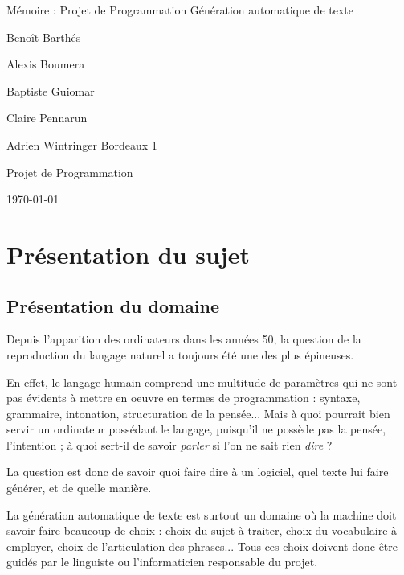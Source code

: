 \documentclass[12pt]{report}
\begin{document}
\begin{titlepage}
\begin{center}

\hfill

\bigskip
\huge{Mémoire  : Projet de Programmation} 
\vfill
\bigskip 
\Huge 
\bigskip Génération automatique de texte \par 
\vfill
\Large Benoît Barthés \par 
		Alexis Boumera \par 
		Baptiste Guiomar \par 
		Claire Pennarun \par 
		Adrien Wintringer
\vfill
\Large Bordeaux 1 \par \Large Projet de Programmation		
		\bigskip 
\bigskip

\Large
\today
\end{center}
\end{titlepage}

\tableofcontents
\newpage

\chapter{Présentation du sujet}

\section{Présentation du domaine}

	Depuis l'apparition des ordinateurs dans les années 50, la question de la reproduction du langage naturel a toujours été une des plus épineuses. \par 
	En effet, le langage humain comprend une multitude de paramètres qui ne sont pas évidents à mettre en oeuvre en termes de programmation : syntaxe, grammaire, intonation, structuration de la pensée... Mais à quoi pourrait bien servir un ordinateur possédant le langage, puisqu'il ne possède pas la pensée, l'intention ; à quoi sert-il de savoir \emph{parler} si l'on ne sait rien \emph{dire} ?

	La question est donc de savoir quoi faire dire à un logiciel, quel texte lui faire générer, et de quelle manière.
	\bigskip 
	
	La génération automatique de texte est surtout un domaine où la machine doit savoir faire beaucoup de choix : choix du sujet à traiter, choix du vocabulaire à employer, choix de l'articulation des phrases... Tous ces choix doivent donc être guidés par le linguiste ou l'informaticien responsable du projet.
	
\end{document}
